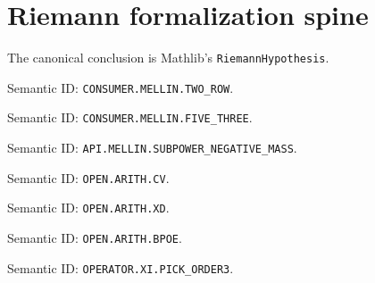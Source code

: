 \section{Riemann formalization spine}

\begin{definition}
\label{def:rh}
The canonical conclusion is Mathlib's \texttt{RiemannHypothesis}.
\end{definition}

\begin{theorem}
\label{thm:rows23}
\notready
Semantic ID: \texttt{CONSUMER.MELLIN.TWO\_ROW}.
\end{theorem}

\begin{theorem}
\label{thm:five-three}
\notready
Semantic ID: \texttt{CONSUMER.MELLIN.FIVE\_THREE}.
\end{theorem}

\begin{theorem}
\label{thm:mellin-landau}
\notready
{}
Semantic ID: \texttt{API.MELLIN.SUBPOWER\_NEGATIVE\_MASS}.
\end{theorem}

\begin{theorem}
\label{thm:cv}
\notready
Semantic ID: \texttt{OPEN.ARITH.CV}.
\end{theorem}

\begin{theorem}
\label{thm:xd}
\notready
Semantic ID: \texttt{OPEN.ARITH.XD}.
\end{theorem}

\begin{theorem}
\label{thm:bpoe}
\notready
Semantic ID: \texttt{OPEN.ARITH.BPOE}.
\end{theorem}

\begin{theorem}
\label{thm:xi-pick-three}
\notready
Semantic ID: \texttt{OPERATOR.XI.PICK\_ORDER3}.
\end{theorem}




